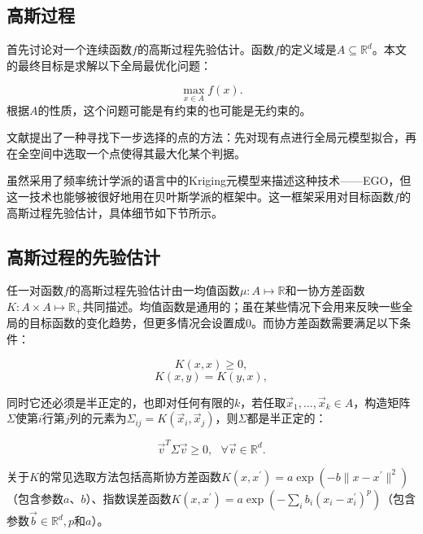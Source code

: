 \documentclass[index]{subfiles}
\begin{document}
\subsection{高斯过程}

首先讨论对一个连续函数$f$的高斯过程先验估计。函数$f$的定义域是$A \subseteq \mathbb{R}^{d}$。本文的最终目标是求解以下全局最优化问题：

\begin{equation}
\max_{x \in A} f(x).
\end{equation}
根据$A$的性质，这个问题可能是有约束的也可能是无约束的。

文献提出了一种寻找下一步选择的点的方法：先对现有点进行全局元模型拟合，再在全空间中选取一个点使得其最大化某个判据。

虽然采用了频率统计学派的语言中的Kriging元模型来描述这种技术——EGO，但这一技术也能够被很好地用在贝叶斯学派的框架中。这一框架采用对目标函数$f$的高斯过程先验估计，具体细节如下节所示。

\subsection{高斯过程的先验估计}

任一对函数$f$的高斯过程先验估计由一均值函数$\mu : A \mapsto \mathbb{R}$和一协方差函数$K : A \times A \mapsto \mathbb{R}_{+}$共同描述。均值函数是通用的；虽在某些情况下会用来反映一些全局的目标函数的变化趋势，但更多情况会设置成0。而协方差函数需要满足以下条件：

\begin{equation}K(x,x) \geq 0,\end{equation}
\begin{equation}K(x,y) = K(y,x),\end{equation}

同时它还必须是半正定的，也即对任何有限的$k$，若任取$\vec{x}_{1}, \ldots, \vec{x}_{k} \in A$，构造矩阵$\Sigma$使第$i$行第$j$列的元素为$\Sigma_{ij} = K(\vec{x}_{i}, \vec{x}_{j})$，则$\Sigma$都是半正定的：

\begin{equation}\vec{v}^{T}\Sigma \vec{v} \geq 0, \ \ \ \forall \vec{v} \in \mathbb{R}^{d}.\end{equation}

关于$K$的常见选取方法包括高斯协方差函数$K(x,x^{\prime}) = a \exp(-b \| x - x^{\prime}\|^{2})$（包含参数$a$、$b$）、指数误差函数$K(x, x^{\prime}) = a \exp(-\sum_{i} b_{i} (x_{i} - x_{i}^{\prime})^{p})$（包含参数$\vec{b} \in \mathbb{R}^{d}, p$和$a$）。
\end{document}
